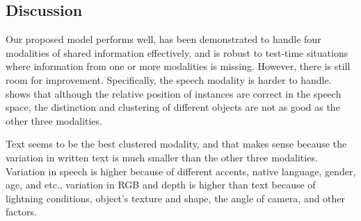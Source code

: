 \documentclass[sigconf,natbib=true,anonymous=true]{acmart}
\begin{document}





\subsection{Discussion}
Our proposed model performs well, has been demonstrated to handle four modalities of shared information effectively, and is robust to test-time situations where information from one or more modalities is missing. However, there is still room for improvement. Specifically, the speech modality is harder to handle.  shows that although the relative position of instances are correct in the speech space, the distinction and clustering of different objects are not as good as the other three modalities.

Text seems to be the best clustered modality, and that makes sense because the variation in written text is much smaller than the other three modalities. Variation in speech is higher because of different accents, native language, gender, age, and etc., variation in RGB and depth is higher than text because of lightning conditions, object's texture and shape, the angle of camera, and other factors.
\end{document}
